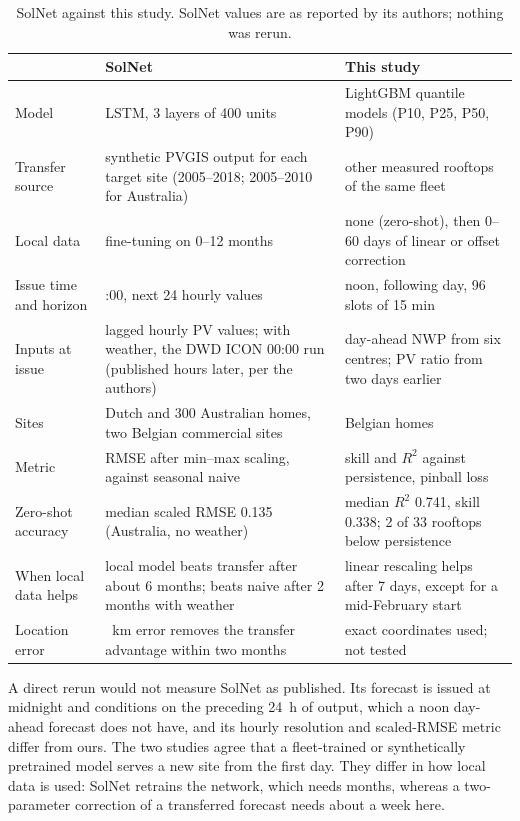 \begin{table}[H]
\centering
\caption{SolNet \citep{Depoortere2025} against this study. SolNet values are as reported by its authors; nothing was rerun.}
\label{tab:s-solnet}
\small
\begin{tabularx}{\textwidth}{@{}>{\raggedright\arraybackslash}p{2.7cm} >{\raggedright\arraybackslash}X >{\raggedright\arraybackslash}X@{}}
\toprule
 & SolNet & This study \\
\midrule
Model & LSTM, 3 layers of 400 units & LightGBM quantile models (P10, P25, P50, P90) \\
Transfer source & synthetic PVGIS output for each target site (2005--2018; 2005--2010 for Australia) & 32 other measured rooftops of the same fleet \\
Local data & fine-tuning on 0--12 months & none (zero-shot), then 0--60 days of linear or offset correction \\
Issue time and horizon & 00:00, next 24 hourly values & noon, following day, 96 slots of 15 min \\
Inputs at issue & 24 lagged hourly PV values; with weather, the DWD ICON 00:00 run (published hours later, per the authors) & day-ahead NWP from six centres; PV ratio from two days earlier \\
Sites & 40 Dutch and 300 Australian homes, two Belgian commercial sites & 33 Belgian homes \\
Metric & RMSE after min--max scaling, against seasonal naive & skill and $R^2$ against persistence, pinball loss \\
Zero-shot accuracy & median scaled RMSE 0.135 (Australia, no weather) & median $R^2$ 0.741, skill 0.338; 2 of 33 rooftops below persistence \\
When local data helps & local model beats transfer after about 6 months; beats naive after 2 months with weather & linear rescaling helps after 7 days, except for a mid-February start \\
Location error & 200~km error removes the transfer advantage within two months & exact coordinates used; not tested \\
\bottomrule
\end{tabularx}
\end{table}

A direct rerun would not measure SolNet as published. Its forecast is issued at midnight and conditions on the preceding 24~h of output, which a noon day-ahead forecast does not have, and its hourly resolution and scaled-RMSE metric differ from ours. The two studies agree that a fleet-trained or synthetically pretrained model serves a new site from the first day. They differ in how local data is used: SolNet retrains the network, which needs months, whereas a two-parameter correction of a transferred forecast needs about a week here.


